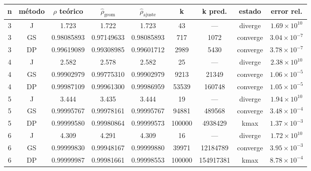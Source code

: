 {\scriptsize
\begin{tabular}{ccccccccc}
\toprule
\rowcolor{Azul1!50}
n & método & $\rho$ teórico & $\hat\rho_{\mathrm{geom}}$ & $\hat\rho_{\mathrm{ajuste}}$ & k & k pred. & estado & error rel. \\
\midrule
3 & J & 1.723 & 1.722 & 1.723 & 43 & --- & diverge & $1.69\times10^{10}$ \\
3 & GS & 0.98085893 & 0.97149633 & 0.98085893 & 717 & 1072 & converge & $3.04\times10^{-7}$ \\
3 & DP & 0.99619089 & 0.99308985 & 0.99601712 & 2989 & 5430 & converge & $3.78\times10^{-7}$ \\
4 & J & 2.582 & 2.578 & 2.582 & 25 & --- & diverge & $2.38\times10^{10}$ \\
4 & GS & 0.99902979 & 0.99775310 & 0.99902979 & 9213 & 21349 & converge & $1.06\times10^{-5}$ \\
4 & DP & 0.99987109 & 0.99961300 & 0.99986959 & 53539 & 160748 & converge & $1.05\times10^{-5}$ \\
5 & J & 3.444 & 3.435 & 3.444 & 19 & --- & diverge & $1.94\times10^{10}$ \\
5 & GS & 0.99995767 & 0.99978161 & 0.99995767 & 94881 & 489568 & converge & $3.48\times10^{-4}$ \\
5 & DP & 0.99999580 & 0.99980864 & 0.99999573 & 100000 & 4938429 & kmax & $1.37\times10^{-3}$ \\
6 & J & 4.309 & 4.291 & 4.309 & 16 & --- & diverge & $1.72\times10^{10}$ \\
6 & GS & 0.99999830 & 0.99948167 & 0.99999880 & 39971 & 12184789 & converge & $3.95\times10^{-3}$ \\
6 & DP & 0.99999987 & 0.99981661 & 0.99998553 & 100000 & 154917381 & kmax & $8.78\times10^{-4}$ \\
\bottomrule
\end{tabular}}
